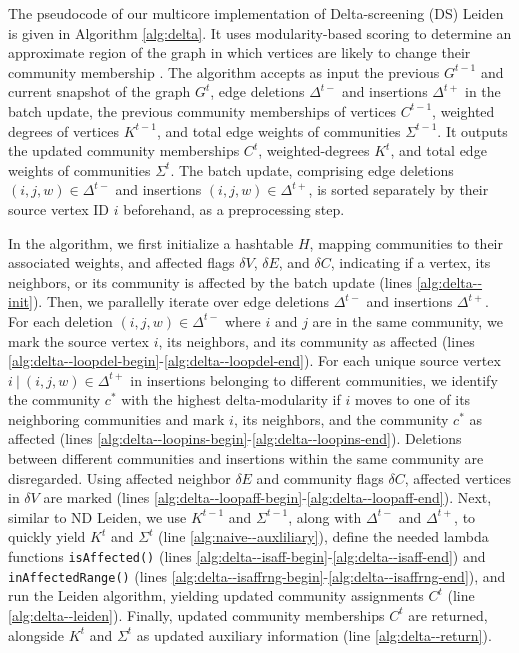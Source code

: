 The pseudocode of our multicore implementation of Delta-screening (DS) Leiden is given in Algorithm \ref{alg:delta}. It uses modularity-based scoring to determine an approximate region of the graph in which vertices are likely to change their community membership \cite{com-zarayeneh21}. The algorithm accepts as input the previous $G^{t-1}$ and current snapshot of the graph $G^t$, edge deletions $\Delta^{t-}$ and insertions $\Delta^{t+}$ in the batch update, the previous community memberships of vertices $C^{t-1}$, weighted degrees of vertices $K^{t-1}$, and total edge weights of communities $\Sigma^{t-1}$. It outputs the updated community memberships $C^t$, weighted-degrees $K^t$, and total edge weights of communities $\Sigma^t$. The batch update, comprising edge deletions $(i, j, w) \in \Delta^{t-}$ and insertions $(i, j, w) \in \Delta^{t+}$, is sorted separately by their source vertex ID $i$ beforehand, as a preprocessing step.




In the algorithm, we first initialize a hashtable $H$, mapping communities to their associated weights, and affected flags $\delta V$, $\delta E$, and $\delta C$, indicating if a vertex, its neighbors, or its community is affected by the batch update (lines \ref{alg:delta--init}). Then, we parallelly iterate over edge deletions $\Delta^{t-}$ and insertions $\Delta^{t+}$. For each deletion $(i, j, w) \in \Delta^{t-}$ where $i$ and $j$ are in the same community, we mark the source vertex $i$, its neighbors, and its community as affected (lines \ref{alg:delta--loopdel-begin}-\ref{alg:delta--loopdel-end}). For each unique source vertex $i\ |\ (i, j, w) \in \Delta^{t+}$ in insertions belonging to different communities, we identify the community $c^*$ with the highest delta-modularity if $i$ moves to one of its neighboring communities and mark $i$, its neighbors, and the community $c^*$ as affected (lines \ref{alg:delta--loopins-begin}-\ref{alg:delta--loopins-end}). Deletions between different communities and insertions within the same community are disregarded. Using affected neighbor $\delta E$ and community flags $\delta C$, affected vertices in $\delta V$ are marked (lines \ref{alg:delta--loopaff-begin}-\ref{alg:delta--loopaff-end}). Next, similar to ND Leiden, we use $K^{t-1}$ and $\Sigma^{t-1}$, along with $\Delta^{t-}$ and $\Delta^{t+}$, to quickly yield $K^t$ and $\Sigma^t$ (line \ref{alg:naive--auxliliary}), define the needed lambda functions \texttt{isAffected()} (lines \ref{alg:delta--isaff-begin}-\ref{alg:delta--isaff-end}) and \texttt{inAffectedRange()} (lines \ref{alg:delta--isaffrng-begin}-\ref{alg:delta--isaffrng-end}), and run the Leiden algorithm, yielding updated community assignments $C^t$ (line \ref{alg:delta--leiden}). Finally, updated community memberships $C^t$ are returned, alongside $K^t$ and $\Sigma^t$ as updated auxiliary information (line \ref{alg:delta--return}).




